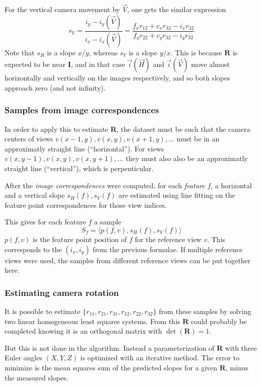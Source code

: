 \documentclass{scrreprt}
\newcommand{\matr}[1]{\mathbf{#1}}
\begin{document}
For the vertical camera movement by $\vec{V}$, one gets the similar expression
\begin{equation}
s_V = \frac{i_y - i_y(\vec{V})}{i_x - i_x(\vec{V})} = \frac{f_x r_{12} + c_x r_{32} - i_x r_{32}}{f_y r_{22} + c_y r_{32} - i_y r_{32}}
\end{equation}
Note that $s_H$ is a slope $x/y$, whereas $s_V$ is a slope $y/x$. This is because $\matr{R}$ is expected to be near $\matr{I}$, and in that case $\vec{i}(\vec{H})$ and $\vec{i}(\vec{V})$ move almost horizontally and vertically on the images respectively, and so both slopes approach zero (and not infinity).


\subsubsection{Samples from image correspondences}
In order to apply this to estimate $\matr{R}$, the dataset must be such that the camera centers of views $v(x-1,y), v(x,y), v(x+1,y), \dots$ must be in an approximatly straight line (``horizontal''). For views $v(x,y-1), v(x,y), v(x,y+1), \dots$ they must also also be an approximatly straight line (``vertical''), which is perpenticular.

After the \emph{image correspondences} were computed, for each \emph{feature} $f$, a horizontal and a vertical slope $s_H(f), s_V(f)$ are estimated using line fitting on the feature point correspondences for those view indices.

This gives for each feature $f$ a sample
\begin{equation}
S_f = \langle p(f,v), s_H(f), s_V(f) \rangle
\end{equation}
$p(f,v)$ is the feature point position of $f$ for the reference view $v$. This corresponds to the $(i_x, i_y)$ from the previous formulae. If multiple reference views were used, the samples from different reference views can be put together here.


\subsubsection{Estimating camera rotation}
It is possible to estimate $\{r_{11}, r_{21}, r_{31}, r_{12}, r_{22}, r_{32}\}$ from these samples by solving two linear homogeneous least squares systems. From this $\matr{R}$ could probably be completed knowing it is an orthogonal matrix with $\det(\matr{R}) = 1$.

But this is not done in the algorithm. Instead a parameterization of $\matr{R}$ with three Euler angles $(X,Y,Z)$ is optimized with an iterative method. The error to minimize is the mean squares sum of the predicted slopes for a given $\matr{R}$, minus the measured slopes.
\end{document}

